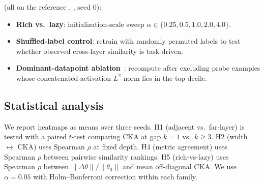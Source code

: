  (all on the reference , \cifar, seed 0):
\begin{itemize}[leftmargin=*,itemsep=0pt,topsep=0pt]
    \item \textbf{Rich vs.\ lazy}: initialization-scale sweep $\alpha\!\in\!\{0.25, 0.5, 1.0, 2.0, 4.0\}$.
    \item \textbf{Shuffled-label control}: retrain with randomly permuted labels to test whether observed cross-layer similarity is task-driven.
    \item \textbf{Dominant-datapoint ablation}~\citep{nguyen2022origins}: recompute \ckam after excluding probe examples whose concatenated-activation $L^2$-norm lies in the top decile.
\end{itemize}

\subsection{Statistical analysis}

We report \ckam heatmaps as means over three seeds. H1 (adjacent vs.\ far-layer) is tested with a paired $t$-test comparing CKA at gap $k\!=\!1$ vs.\ $k\!\geq\!3$. H2 (width $\leftrightarrow$ CKA) uses Spearman $\rho$ at fixed depth. H4 (metric agreement) uses Spearman $\rho$ between pairwise similarity rankings. H5 (rich-vs-lazy) uses Spearman $\rho$ between $\|\Delta\theta\|/\|\theta_0\|$ and mean off-diagonal CKA. We use $\alpha = 0.05$ with Holm--Bonferroni correction within each family.
